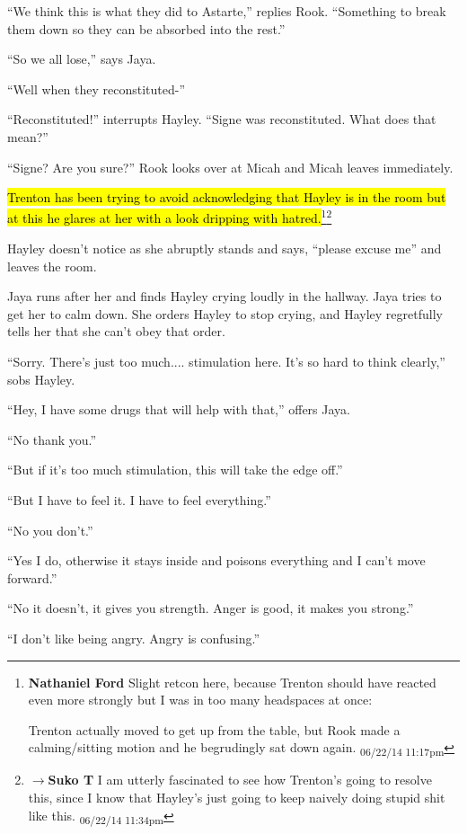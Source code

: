 ``We think this is what they did to Astarte,'' replies Rook.  ``Something to break them down so they can be absorbed into the rest.''

``So we all lose,'' says Jaya.

``Well when they reconstituted-''

``Reconstituted!'' interrupts Hayley.  ``Signe was reconstituted. What does that mean?''

``Signe?  Are you sure?'' Rook looks over at Micah and Micah leaves immediately.

\hl{Trenton has been trying to avoid acknowledging that Hayley is in the room but at this he glares at her with a look dripping with hatred.}\footnote{\textbf{Nathaniel Ford }Slight retcon here, because Trenton should have reacted even more strongly but I was in too many headspaces at once:

Trenton actually moved to get up from the table, but Rook made a calming/sitting motion and he begrudingly sat down again. \textsubscript{06/22/14 11:17pm}}\footnote{$\rightarrow$\textbf{Suko T }I am utterly fascinated to see how Trenton's going to resolve this, since I know that Hayley's just going to keep naively doing stupid shit like this. \textsubscript{06/22/14 11:34pm}}  

Hayley doesn't notice as she abruptly stands and says, ``please excuse me'' and leaves the room.



Jaya runs after her and finds Hayley crying loudly in the hallway.  Jaya tries to get her to calm down.  She orders Hayley to stop crying, and Hayley regretfully tells her that she can't obey that order.

``Sorry.  There's just too much.... stimulation here. It's so hard to think clearly,'' sobs Hayley.

``Hey, I have some drugs that will help with that,'' offers Jaya.

``No thank you.''

``But if it's too much stimulation, this will take the edge off.''

``But I have to feel it.  I have to feel everything.''

``No you don't.''

``Yes I do, otherwise it stays inside and poisons everything and I can't move forward.''

``No it doesn't, it gives you strength.  Anger is good, it makes you strong.''

``I don't like being angry.  Angry is confusing.''

